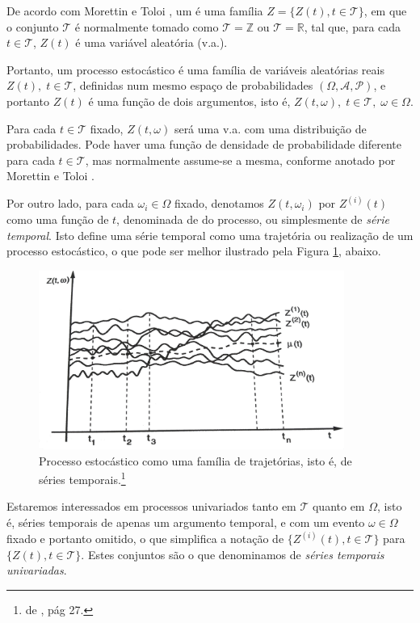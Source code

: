 De acordo com Morettin e Toloi \citep{morettin}, um  é uma família $Z = \{ Z(t), t \in \mathcal{T} \}$, em que o conjunto $\mathcal{T}$ é normalmente tomado como $\mathcal{T} = \mathbb{Z}$ ou $\mathcal{T} = \mathbb{R}$, tal que, para cada $t \in \mathcal{T}$, $Z(t)$ é uma variável aleatória (v.a.). 

Portanto, um processo estocástico é uma família de variáveis aleatórias reais $Z(t),\; t \in \mathcal{T}$, definidas num mesmo espaço de probabilidades $(\Omega, \mathcal{A}, \mathcal{P})$, e portanto $Z(t)$ é uma função de dois argumentos, isto é, $Z(t, \omega),\; t \in \mathcal{T},\; \omega \in \Omega$.

Para cada $t \in \mathcal{T}$ fixado, $Z(t, \omega)$ será uma v.a. com uma distribuição de probabilidades. Pode haver uma função de densidade de probabilidade diferente para cada $t \in \mathcal{T}$, mas normalmente assume-se a mesma, conforme anotado por Morettin e Toloi \citep{morettin}.

Por outro lado, para cada $\omega_i \in \Omega$ fixado, denotamos $Z(t, \omega_i)$ por $Z^{(i)}(t)$ como uma função de $t$, denominada de  do processo, ou simplesmente de \emph{série temporal}. Isto define uma série temporal como uma trajetória ou realização de um processo estocástico, o que pode ser melhor ilustrado pela Figura \ref{fig:trajetorias}, abaixo.

\begin{figure}[htb]
\centering
\includegraphics[width=10cm]{figuras/trajetorias}
\caption{Processo estocástico como uma família de trajetórias, isto é, de séries temporais.\footnote{  de \citep{morettin}, pág 27.}}
\label{fig:trajetorias}
\end{figure}

Estaremos interessados em processos univariados tanto em $\mathcal{T}$ quanto em $\Omega$, isto é, séries temporais de apenas um argumento temporal, e com um evento $\omega \in \Omega$ fixado e portanto omitido, o que simplifica a notação de $\{Z^{(i)}(t), t \in \mathcal{T}\}$ para $\{Z(t), t \in \mathcal{T}\}$. Estes conjuntos são o que denominamos de \emph{séries temporais univariadas}.


